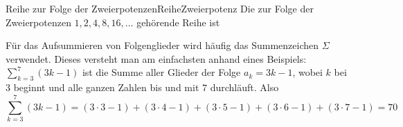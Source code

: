 \begin{bsp}
    {Reihe zur Folge der Zweierpotenzen}{ReiheZweierpotenz}
    Die zur Folge der Zweierpotenzen $1, 2, 4, 8, 16, \dots$ gehörende Reihe ist


    \vspace*{3cm}
\end{bsp}

Für das Aufsummieren von Folgenglieder wird häufig das Summenzeichen $\Sigma$ verwendet. Dieses versteht man am einfachsten anhand eines Beispiels: $\sum_{k=3}^{7} (3k-1)$ ist die Summe aller Glieder der Folge $a_k=3k-1$, wobei $k$ bei $3$ beginnt und alle ganzen Zahlen bis und mit $7$ durchläuft. Also
$$\sum_{k=3}^{7} (3k-1) = (3\cdot 3 -1)+ (3\cdot 4 -1)+ (3\cdot 5 -1)+ (3\cdot 6 -1)+ (3\cdot 7 -1)=70$$



